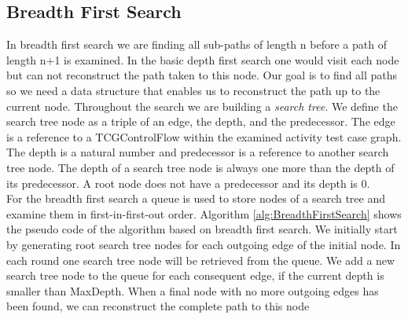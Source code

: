 \subsection{Breadth First Search}
In breadth first search we are finding all sub-paths of length n before a path of length n+1 is examined. In the basic depth first search one would visit each node but can not reconstruct the path taken to this node. Our goal is to find all paths so we need a data structure that enables us to reconstruct the path up to the current node. Throughout the search we are building a \emph{search tree}. We define the search tree node as a triple of an edge, the depth, and the predecessor. The edge is a reference to a TCGControlFlow within the examined activity test case graph. The depth is a natural number and predecessor is a reference to another search tree node. The depth of a search tree node is always one more than the depth of its predecessor. A root node does not have a predecessor and its depth is $0$.\\
For the breadth first search a queue is used to store nodes of a search tree and examine them in first-in-first-out order. Algorithm \ref{alg:BreadthFirstSearch} shows the pseudo code of the algorithm based on breadth first search. We initially start by generating root search tree nodes for each outgoing edge of the initial node. In each round one search tree node will be retrieved from the queue. We add a new search tree node to the queue for each consequent edge, if the current depth is smaller than MaxDepth. When a final node with no more outgoing edges has been found, we can reconstruct the complete path to this node 
